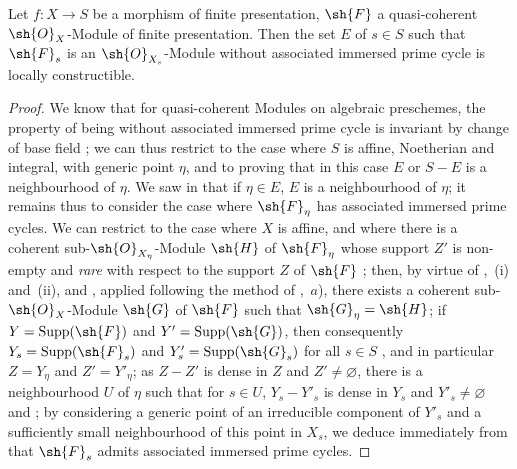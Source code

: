\begin{proposition}[9.8.1]
\label{IV.9.8.1}
Let $f:X\to S$ be a morphism of finite presentation, $\sh{F}$ a quasi-coherent $\sh{O}_X$-Module of finite presentation.
Then the set $E$ of $s\in S$ such that $\sh{F}_s$ is an $\sh{O}_{X_s}$-Module without associated immersed prime cycle is locally constructible.
\end{proposition}

\begin{proof}
\label{IV.9.8.1-proof}
We know that for quasi-coherent Modules on algebraic preschemes, the property of being without associated immersed prime cycle is invariant by change of base field ; we can thus restrict to the case where $S$ is affine, Noetherian and integral, with generic point $\eta$, and to proving that in this case $E$ or $S-E$ is a neighbourhood of $\eta$.
We saw in  that if $\eta\in E$, $E$ is a neighbourhood of $\eta$; it remains thus to consider the case where $\sh{F}_\eta$ has associated immersed prime cycles.
We can restrict to the case where $X$ is affine, and where there is a coherent sub-$\sh{O}_{X_\eta}$-Module $\sh{H}$ of $\sh{F}_\eta$ whose support $Z'$ is non-empty and \emph{rare} with respect to the support $Z$ of $\sh{F}$ ; then, by virtue of ,~(i) and~(ii),
and , applied following the method of ,~$a$), there exists a coherent sub-$\sh{O}_X$-Module $\sh{G}$ of $\sh{F}$ such that $\sh{G}_\eta=\sh{H}$; if $Y=\operatorname{Supp}(\sh{F})$ and $Y'=\operatorname{Supp}(\sh{G})$, then consequently $Y_s=\operatorname{Supp}(\sh{F}_s)$ and $Y'_s=\operatorname{Supp}(\sh{G}_s)$ for all $s\in S$ , and in particular $Z=Y_\eta$ and $Z'=Y'_\eta$; as $Z-Z'$ is dense in $Z$ and $Z'\neq\varnothing$, there is a neighbourhood $U$ of $\eta$ such that for $s\in U$, $Y_s-Y'_s$ is dense in $Y_s$ and $Y'_s\neq\varnothing$  and ; by considering a generic point of an irreducible component of $Y'_s$ and a sufficiently small neighbourhood of this point in $X_s$, we deduce immediately from  that $\sh{F}_s$ admits associated immersed prime cycles.
\end{proof}

